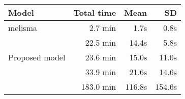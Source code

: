 \begin{tabular}{l|rrr}
    Model                        & Total time & Mean    & SD     \\ \hline
    \gls{melisma}                & 2.7 min    & 1.7s    & 0.8s   \\
    \textcite{chen2021attend}    & 22.5 min   & 14.4s   & 5.8s   \\
    Proposed model               & 23.6 min   & 15.0s   & 11.0s  \\
    \textcite{micchi2021deep}    & 33.9 min   & 21.6s   & 14.6s  \\
    \textcite{mcleod2021modular} & 183.0 min  & 116.8s  & 154.6s \\
\end{tabular}

